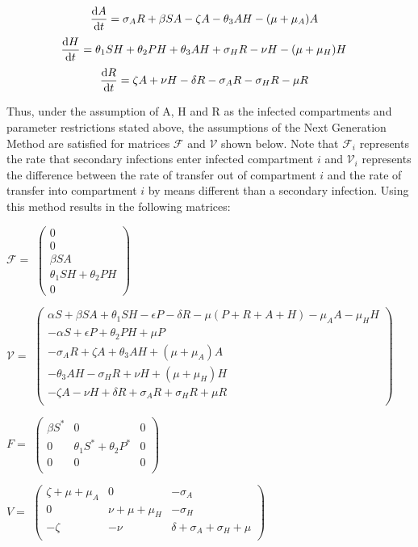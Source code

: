 \documentclass[12pt]{article}
\begin{document}
\[\dv{A}{t} = \sigma_{A} R +\beta SA  -\zeta A - \theta_{3}AH-(\mu + \mu_{A})A   \quad\]
\[\dv{H}{t} = \theta_{1}SH+\theta_{2}PH+\theta_{3}AH + \sigma_{H}R-\nu H-(\mu+\mu_{H})H  \quad\]
\[\dv{R}{t} = \zeta A +\nu H -\delta R -\sigma_{A}R-\sigma_{H}R -\mu R\quad\]

Thus, under the assumption of A, H and R as the infected compartments and parameter restrictions stated above, the assumptions of the Next Generation Method are satisfied for matrices $\mathscr{F}$ and $\mathscr{V}$ shown below. Note that $\mathscr{F}_{i}$ represents the rate that secondary infections enter infected compartment $i$ and $\mathscr{V}_{i}$ represents the difference between the rate of transfer out of compartment $i$ and the rate of transfer into compartment $i$ by means different than a secondary infection. Using this method results in the following matrices:

\begin{center}
$\mathscr{F}=$
$ \begin{pmatrix}

0 \\
0 \\
\beta SA \\
\theta_{1}SH+\theta_{2}PH \\
0
\end{pmatrix}$



$\mathscr{V}=$
$ \begin{pmatrix}

\alpha S + \beta SA+\theta_{1}SH-\epsilon P-\delta R-\mu(P+R+A+H)-\mu_{A}A-\mu_{H}H \\
-\alpha S+\epsilon P +\theta_{2}PH +\mu P \\
-\sigma_{A}R+\zeta A+\theta_{3} AH + (\mu +\mu_{A})A \\
-\theta_{3}AH-\sigma_{H}R+\nu H +(\mu +\mu_{H}) H \\
-\zeta A -\nu H +\delta R +\sigma_{A}R +\sigma_{H}R +\mu R\\
\end{pmatrix}$
\end{center}

\begin{center}
$F=$
$ \begin{pmatrix}

\beta S^* &  0  & 0 \\
0 & \theta_1 S^* +\theta_2 P^* & 0\\
0  &   0 & 0\\
\end{pmatrix}$



$V=$
$ \begin{pmatrix}

\zeta +\mu +\mu_A &  0  & -\sigma_A \\
0 &  \nu+\mu+\mu_H & -\sigma_H\\
-\zeta& -\nu  & \delta + \sigma_A + \sigma_H + \mu\\

\end{pmatrix}$
\end{center}
\end{document}
